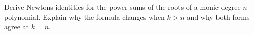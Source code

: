 Derive Newton\textquotesingle s identities for the power sums of the roots of a monic degree-$n$ polynomial. Explain why the formula changes when $k>n$ and why both forms agree at $k=n$.

